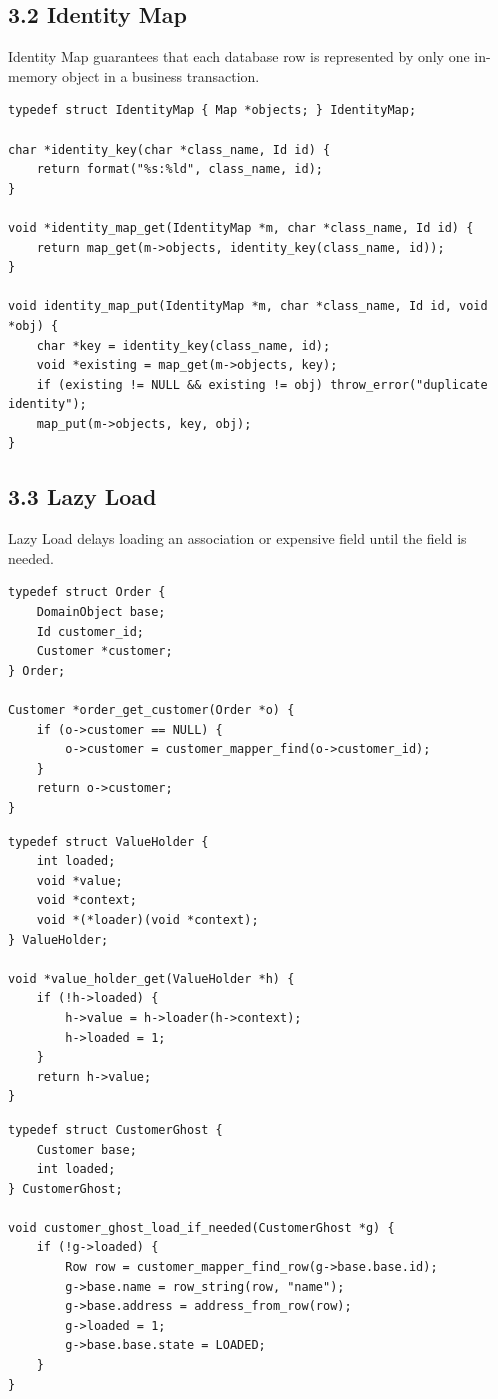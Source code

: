 \documentclass[11pt]{article}
\begin{document}
\subsection{3.2 Identity Map}\label{identity-map}

Identity Map guarantees that each database row is represented by only
one in-memory object in a business transaction.

\begin{verbatim}
typedef struct IdentityMap { Map *objects; } IdentityMap;

char *identity_key(char *class_name, Id id) {
    return format("%s:%ld", class_name, id);
}

void *identity_map_get(IdentityMap *m, char *class_name, Id id) {
    return map_get(m->objects, identity_key(class_name, id));
}

void identity_map_put(IdentityMap *m, char *class_name, Id id, void *obj) {
    char *key = identity_key(class_name, id);
    void *existing = map_get(m->objects, key);
    if (existing != NULL && existing != obj) throw_error("duplicate identity");
    map_put(m->objects, key, obj);
}
\end{verbatim}

\subsection{3.3 Lazy Load}\label{lazy-load}

Lazy Load delays loading an association or expensive field until the
field is needed.

\begin{verbatim}
typedef struct Order {
    DomainObject base;
    Id customer_id;
    Customer *customer;
} Order;

Customer *order_get_customer(Order *o) {
    if (o->customer == NULL) {
        o->customer = customer_mapper_find(o->customer_id);
    }
    return o->customer;
}
\end{verbatim}

\begin{verbatim}
typedef struct ValueHolder {
    int loaded;
    void *value;
    void *context;
    void *(*loader)(void *context);
} ValueHolder;

void *value_holder_get(ValueHolder *h) {
    if (!h->loaded) {
        h->value = h->loader(h->context);
        h->loaded = 1;
    }
    return h->value;
}
\end{verbatim}

\begin{verbatim}
typedef struct CustomerGhost {
    Customer base;
    int loaded;
} CustomerGhost;

void customer_ghost_load_if_needed(CustomerGhost *g) {
    if (!g->loaded) {
        Row row = customer_mapper_find_row(g->base.base.id);
        g->base.name = row_string(row, "name");
        g->base.address = address_from_row(row);
        g->loaded = 1;
        g->base.base.state = LOADED;
    }
}
\end{verbatim}
\end{document}
